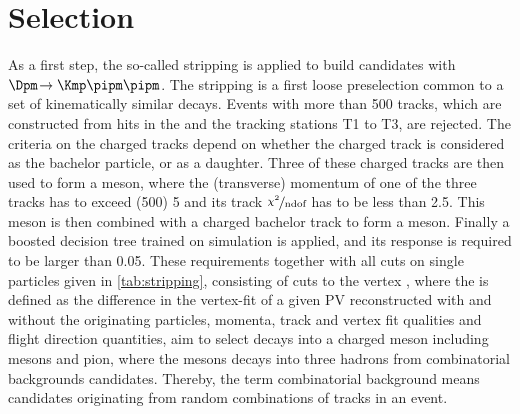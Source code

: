 \section{Selection}
\label{sec:selection}

As a first step, the so-called stripping is applied to build \BdToDpi candidates with \mbox{$\Dpm\!\to\Kmp\pipm\pipm$}.
The stripping is a first loose preselection common to a set of kinematically similar decays.
Events with more than \num{500} tracks, which are constructed from hits in the \velo and the tracking stations T1 to T3, are rejected.
The criteria on the charged tracks depend on whether the charged track is considered as the bachelor particle, or as a \Dm daughter.
Three of these charged tracks are then used to form a \Dm meson, where the (transverse) momentum of one of the three tracks has to exceed (\SI[per-mode=symbol]{500}{\MeVc}) \SI[per-mode=symbol]{5}{\GeVc} and its track $\nicefrac{\chi^2}{\text{ndof}}$ has to be less than \num{2.5}.
This \Dm meson is then combined with a charged bachelor track to form a \Bz meson.
Finally a boosted decision tree trained on simulation is applied, and its response is required to be larger than \num{0.05}.
These requirements together with all cuts on single particles given in \cref{tab:stripping}, consisting of cuts to the vertex \chisqip, where the \chisqip is defined as the difference in the vertex-fit of a given \ac{PV} reconstructed with and without the originating particles, momenta, track and vertex fit qualities and flight direction quantities, aim to select \Bz decays into a charged \Dmp meson including \Dstarmp mesons and pion, where the \Dmp mesons decays into three hadrons from combinatorial backgrounds candidates.
Thereby, the term combinatorial background means candidates originating from random combinations of tracks in an event.
